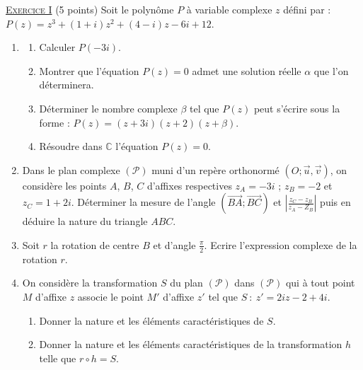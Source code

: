 \providecommand{\Courbe}{(\mathscr{C})}
\providecommand{\D}{(\mathscr{D})}
\providecommand{\Plan}{(\mathscr{P})}
\providecommand{\Ouv}{(O ; \vec{u} , \vec{v})}
\providecommand{\cm}{~\mathrm{cm}}
\providecommand{\dx}{~\mathrm{d}x}
\providecommand{\Arg}[1]{\mathrm{Arg}\left( #1 \right)}
\providecommand{\Angl}[2]{\left( \overrightarrow{#1} ; \overrightarrow{#2} \right)}

\noindent \underline{\textsc{Exercice I}} (5 points) \newline
      Soit le polyn\^ome $P$ \`a variable complexe $z$ d\'efini par : 
      $P(z) = z^3 + (1+i) z^2 + (4-i) z - 6i + 12$.
      \begin{enumerate}
            \item \begin{enumerate}
                        \item Calculer $P(-3i)$.
	                        \item Montrer que l'\'equation $P(z) = 0$ admet une solution r\'eelle $\alpha$ que l'on d\'eterminera.
                        \item D\'eterminer le nombre complexe $\beta$ tel que $P(z)$ peut s'\'ecrire sous la forme :
                              $P(z) = (z+3i) (z+2) (z+\beta)$.
                        \item R\'esoudre dans $\mathbb{C}$ l'\'equation $P(z) = 0$.
                  \end{enumerate}
            \item Dans le plan complexe $\Plan$ muni d'un rep\`ere orthonorm\'e $\Ouv$, on consid\`ere les points 
                  $A$, $B$, $C$ d'affixes respectives $z_A = -3i$ ; $z_B = -2$ et $z_C = 1 + 2i$.
                  D\'eterminer la mesure de l'angle $\Angl{BA}{BC}$ et $\left| \frac{z_C - z_B}{z_A - Z_B} \right|$
                  puis en d\'eduire la nature du triangle $ABC$.
            \item Soit $r$ la rotation de centre $B$ et d'angle $\frac{\pi}{2}$.
                  Ecrire l'expression complexe de la rotation $r$.
            \item On consid\`ere la transformation $S$ du plan $\Plan$ dans $\Plan$ qui \`a tout point $M$
                  d'affixe $z$ associe le point $M'$ d'affixe $z'$ tel que $S\ :\ z' = 2iz - 2 + 4i$.
                  \begin{enumerate}
                        \item Donner la nature et les \'el\'ements caract\'eristiques de $S$.
                        \item Donner la nature et les éléments caractéristiques de la transformation $h$ telle que
                              $r \circ h = S$.
                  \end{enumerate}
      \end{enumerate}
